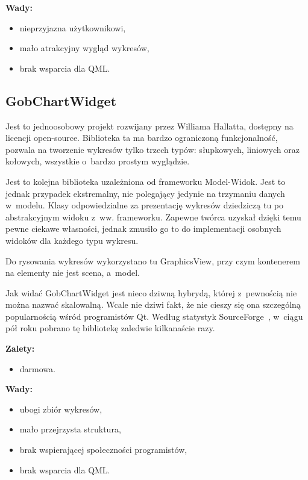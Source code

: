 \documentclass[11pt,twoside,a4paper,final]{llncs}
\begin{document}
\textbf{Wady:}
\begin{itemize}
\item{nieprzyjazna użytkownikowi,}
\item{mało atrakcyjny wygląd wykresów,}
\item{brak wsparcia dla QML.}
\end{itemize}

\subsection{GobChartWidget}
Jest to jednoosobowy projekt rozwijany przez Williama Hallatta, dostępny na licencji open-source. Biblioteka ta ma bardzo ograniczoną funkcjonalność, pozwala na tworzenie wykresów tylko trzech typów: słupkowych, liniowych oraz kołowych, wszystkie o~bardzo prostym wyglądzie.\newline

Jest to kolejna biblioteka uzależniona od frameworku Model-Widok. Jest to jednak przypadek ekstremalny, nie polegający jedynie na trzymaniu danych w~modelu. Klasy odpowiedzialne za prezentację wykresów dziedziczą tu po abstrakcyjnym widoku z~ww. frameworku. Zapewne twórca uzyskał dzięki temu pewne ciekawe własności, jednak zmusiło go to do implementacji osobnych widoków dla każdego typu wykresu.\newline

Do rysowania wykresów wykorzystano tu GraphicsView, przy czym kontenerem na elementy nie jest scena, a~model.\newline

Jak widać GobChartWidget jest nieco dziwną hybrydą, której z~pewnością nie można nazwać skalowalną. Wcale nie dziwi fakt, że nie cieszy się ona szczególną popularnością wśród programistów Qt. Według statystyk SourceForge~\cite{forge}, w~ciągu pół roku pobrano tę bibliotekę zaledwie kilkanaście razy.

\textbf{Zalety:}
\begin{itemize}
\item{darmowa.}\newline
\end{itemize}

\textbf{Wady:}
\begin{itemize}
\item{ubogi zbiór wykresów,}
\item{mało przejrzysta struktura,}
\item{brak wspierającej społeczności programistów,}
\item{brak wsparcia dla QML.}
\end{itemize}
\end{document}
